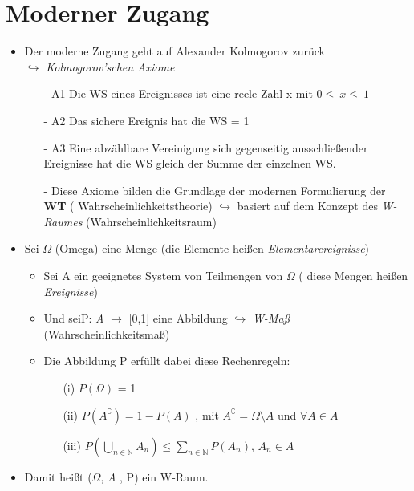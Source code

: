 \documentclass[12pt,a4paper]{article}
\begin{document}
	\section*{Moderner Zugang}
	\begin{itemize}
		\item Der moderne Zugang geht auf Alexander Kolmogorov zurück\\
		$\hookrightarrow$ \textit{Kolmogorov'schen Axiome}
		\begin{itemize}
			\item[- A1] Die WS eines Ereignisses ist eine reele Zahl x mit $0 \leq\ x \leq\ 1$
			\item[- A2] Das sichere Ereignis hat die WS = 1
			\item[- A3] Eine abzählbare Vereinigung sich gegenseitig ausschließender Ereignisse hat die WS 
			gleich der Summe der einzelnen WS.
			\item[-   ] Diese Axiome bilden die Grundlage der modernen Formulierung der \textbf{WT} (	 						Wahrscheinlichkeitstheorie) \newline
			 \newline
			$\hookrightarrow$ basiert auf dem Konzept des \textit{W-Raumes} (Wahrscheinlichkeitsraum)			
		\end{itemize}
		\item Sei $\Omega$ (Omega) eine Menge (die Elemente heißen \textit{Elementarereignisse})
		\begin{itemize}
			\item Sei A ein geeignetes System von Teilmengen von $\Omega$ ( diese Mengen heißen 								\textit{Ereignisse})
			\item Und sei\space\space P: \textit{A} $\rightarrow$  [0,1] eine Abbildung\newline
			$\hookrightarrow$ \textit{W-Maß} (Wahrscheinlichkeitsmaß)
			\item Die Abbildung P erfüllt dabei diese Rechenregeln:
			\begin{itemize}
				\item[(i)   ] $P\left(\Omega\right)$ = 1
				\item[(ii)  ] $P(A^\complement) = 1 - P(A)$ , 
				mit $A^\complement = \Omega\setminus A$ und 
				$\forall A \in \textit{A}$
				\item[(iii) ] $P\left(\bigcup_{n\in \mathbb{N}}A_{n}\right) \leq \sum_{n\in \mathbb{N}}
				P(A_{n})$, \space\space\space $A_{n}\in \textit{A}$ 				
			\end{itemize}						
		\end{itemize}
		\item Damit heißt ($\Omega$, \textit{A} , P) ein W-Raum.
	\end{itemize}
\newpage
\end{document}
